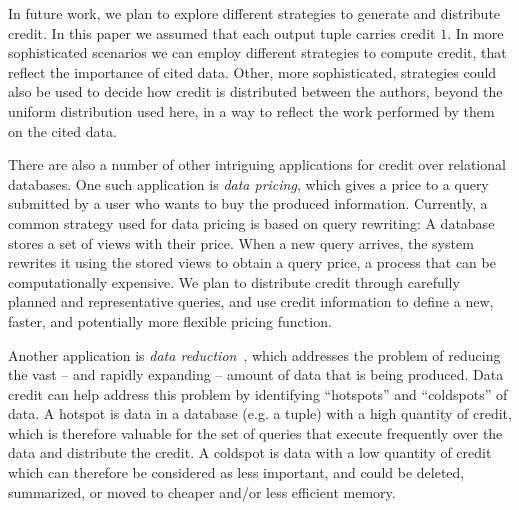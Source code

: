 In future work, we plan to explore different strategies to generate and distribute credit. In this paper we assumed that each output tuple carries credit $1$. In more sophisticated scenarios we can employ different strategies to compute credit, that reflect the importance of cited data.
Other, more sophisticated, strategies could also be used to decide how credit is distributed between the authors, beyond the uniform distribution used here, in a way to reflect the work performed by them on the cited data.  

There are also a number of other intriguing applications for credit over relational databases.
One such application is \emph{data pricing}, which gives a price to a query submitted by a user who wants to buy the produced information. Currently, a common strategy used for data pricing is based on query rewriting:  A database stores a set of views with their price. When a new query arrives, the system rewrites it using the stored views to obtain a query price, a process that can be computationally expensive.
We plan to distribute credit through carefully planned and representative queries, and use credit information to define a new, faster, and potentially more flexible pricing function.

Another application is \emph{data reduction}~\cite{milo2019getting}, which addresses the problem of reducing the vast -- and rapidly expanding -- amount of data that is being produced. %
Data credit can help address this problem by identifying ``hotspots'' and ``coldspots'' of data. A hotspot is data in a database (e.g. a tuple) with a high quantity of credit, which is therefore valuable for the set of queries that execute frequently over the data and distribute the credit. 
A coldspot is data with a low quantity of credit which can therefore be considered as less  important, and could be deleted, summarized, or moved to cheaper and/or less efficient memory. 

